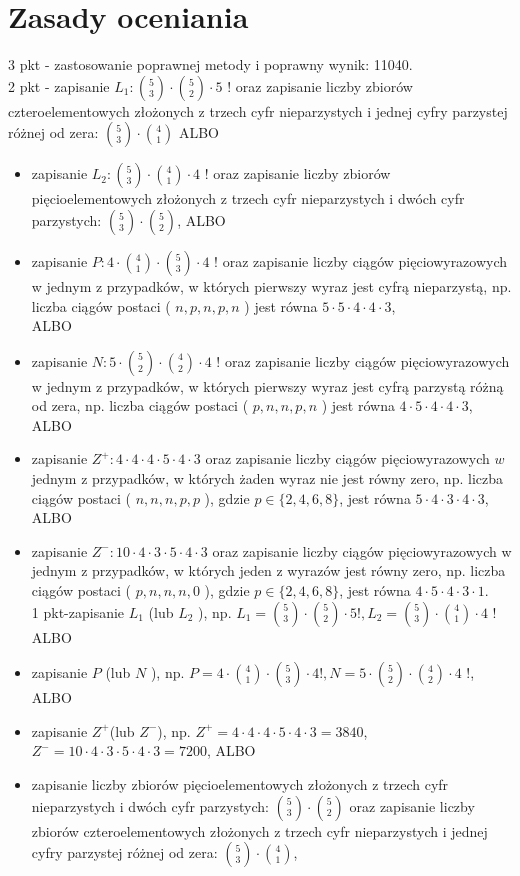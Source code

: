\documentclass[10pt]{article}
\begin{document}
\section*{Zasady oceniania}
3 pkt - zastosowanie poprawnej metody i poprawny wynik: 11040.\\
2 pkt - zapisanie $L_{1}:\binom{5}{3} \cdot\binom{5}{2} \cdot 5$ ! oraz zapisanie liczby zbiorów czteroelementowych złożonych z trzech cyfr nieparzystych i jednej cyfry parzystej różnej od zera: $\binom{5}{3} \cdot\binom{4}{1}$ ALBO

\begin{itemize}
  \item zapisanie $L_{2}:\binom{5}{3} \cdot\binom{4}{1} \cdot 4$ ! oraz zapisanie liczby zbiorów pięcioelementowych złożonych z trzech cyfr nieparzystych i dwóch cyfr parzystych: $\binom{5}{3} \cdot\binom{5}{2}$, ALBO
  \item zapisanie $P: 4 \cdot\binom{4}{1} \cdot\binom{5}{3} \cdot 4$ ! oraz zapisanie liczby ciągów pięciowyrazowych w jednym z przypadków, w których pierwszy wyraz jest cyfrą nieparzystą, np. liczba ciągów postaci ( $n, p, n, p, n$ ) jest równa $5 \cdot 5 \cdot 4 \cdot 4 \cdot 3$,\\
ALBO
  \item zapisanie $N: 5 \cdot\binom{5}{2} \cdot\binom{4}{2} \cdot 4$ ! oraz zapisanie liczby ciągów pięciowyrazowych w jednym z przypadków, w których pierwszy wyraz jest cyfrą parzystą różną od zera, np. liczba ciągów postaci ( $p, n, n, p, n$ ) jest równa $4 \cdot 5 \cdot 4 \cdot 4 \cdot 3$, ALBO
  \item zapisanie $Z^{+}: 4 \cdot 4 \cdot 4 \cdot 5 \cdot 4 \cdot 3$ oraz zapisanie liczby ciągów pięciowyrazowych $w$ jednym z przypadków, w których żaden wyraz nie jest równy zero, np. liczba ciągów postaci ( $n, n, n, p, p$ ), gdzie $p \in\{2,4,6,8\}$, jest równa $5 \cdot 4 \cdot 3 \cdot 4 \cdot 3$, ALBO
  \item zapisanie $Z^{-}: 10 \cdot 4 \cdot 3 \cdot 5 \cdot 4 \cdot 3$ oraz zapisanie liczby ciągów pięciowyrazowych w jednym z przypadków, w których jeden z wyrazów jest równy zero, np. liczba ciągów postaci ( $p, n, n, n, 0$ ), gdzie $p \in\{2,4,6,8\}$, jest równa $4 \cdot 5 \cdot 4 \cdot 3 \cdot 1$.\\
1 pkt-zapisanie $L_{1}$ (lub $L_{2}$ ), np. $L_{1}=\binom{5}{3} \cdot\binom{5}{2} \cdot 5!, L_{2}=\binom{5}{3} \cdot\binom{4}{1} \cdot 4$ !\\
ALBO
  \item zapisanie $P$ (lub $N$ ), np. $P=4 \cdot\binom{4}{1} \cdot\binom{5}{3} \cdot 4!, N=5 \cdot\binom{5}{2} \cdot\binom{4}{2} \cdot 4$ !, ALBO
  \item zapisanie $Z^{+}$(lub $Z^{-}$), np. $Z^{+}=4 \cdot 4 \cdot 4 \cdot 5 \cdot 4 \cdot 3=3840$, $Z^{-}=10 \cdot 4 \cdot 3 \cdot 5 \cdot 4 \cdot 3=7200$, ALBO
  \item zapisanie liczby zbiorów pięcioelementowych złożonych z trzech cyfr nieparzystych i dwóch cyfr parzystych: $\binom{5}{3} \cdot\binom{5}{2}$ oraz zapisanie liczby zbiorów czteroelementowych złożonych z trzech cyfr nieparzystych i jednej cyfry parzystej różnej od zera: $\binom{5}{3} \cdot\binom{4}{1}$,
\end{itemize}
\end{document}
